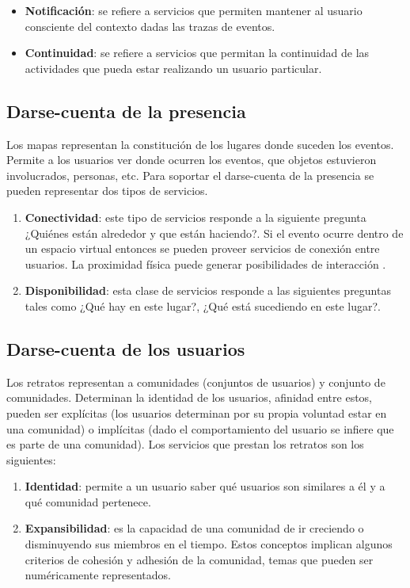 \begin{itemize}
\item \textbf{Notificación}: se refiere a servicios que permiten mantener al usuario consciente del contexto dadas las trazas de eventos.
\item \textbf{Continuidad}: se refiere a servicios que permitan la continuidad de las actividades que pueda estar realizando un usuario particular.
\end{itemize}

\subsection{Darse-cuenta de la presencia}

Los mapas representan la constitución de los lugares donde suceden los eventos. Permite a los usuarios ver donde ocurren los eventos, que objetos estuvieron involucrados, personas, etc. Para soportar el darse-cuenta de la presencia se pueden representar dos tipos de servicios.

\begin{enumerate}
\item \textbf{Conectividad}: este tipo de servicios responde a la siguiente pregunta ¿Quiénes están alrededor y que están haciendo?. Si el evento ocurre dentro de un espacio virtual entonces se pueden proveer servicios de conexión entre usuarios. La proximidad física puede generar posibilidades de interacción \citep{Leiva:2002}.
\item \textbf{Disponibilidad}: esta clase de servicios responde a las siguientes preguntas tales como ¿Qué hay en este lugar?, ¿Qué está sucediendo en este lugar?.
\end{enumerate}

\subsection{Darse-cuenta de los usuarios}

Los retratos representan a comunidades (conjuntos de usuarios) y conjunto de comunidades. Determinan la identidad de los usuarios, afinidad entre estos, pueden ser explícitas (los usuarios determinan por su propia voluntad estar en una comunidad) o implícitas (dado el comportamiento del usuario se infiere que es parte de una comunidad). Los servicios que prestan los retratos son los siguientes:

\begin{enumerate}
\item \textbf{Identidad}: permite a un usuario saber qué usuarios son similares a él y a qué comunidad pertenece.
\item \textbf{Expansibilidad}: es la capacidad de una comunidad de ir creciendo o disminuyendo sus miembros en el tiempo. Estos conceptos implican algunos criterios de cohesión y adhesión de la comunidad, temas que pueden ser numéricamente representados.
\end{enumerate}

